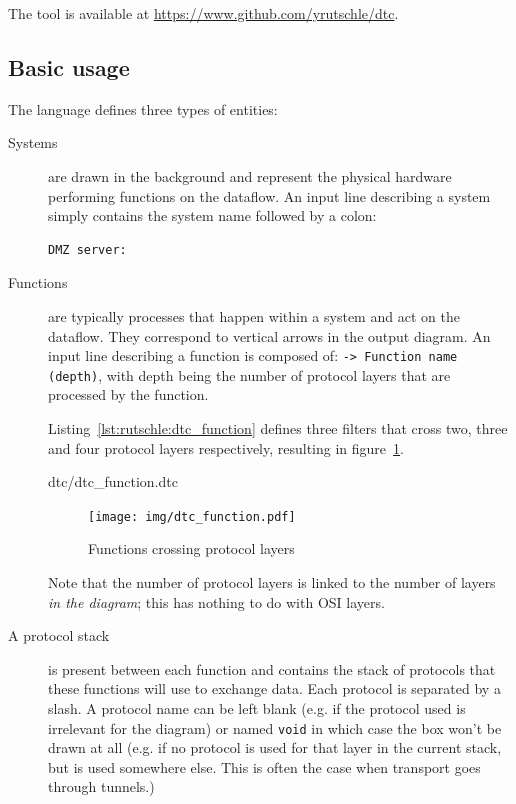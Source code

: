 \documentclass{article}
\begin{document}
The tool is available at \url{https://www.github.com/yrutschle/dtc}.

\subsection{Basic usage}


The language defines three types of entities:

\begin{description}
	\item[Systems] are drawn in the background and represent the
    physical hardware performing functions on the dataflow. An
    input line describing a system simply contains the system
    name followed by a colon:

    \begin{lstlisting}[language={},caption={System line},label={lst:rutschle:dtc_system}]
        DMZ server:
	\end{lstlisting}

\item[Functions] are typically processes that happen within a system and act on
	the dataflow. They correspond to vertical arrows in the output diagram.
	An input line describing a function is composed of:
	\verb+-> Function name (depth)+, with depth being
	the number of protocol layers that are
	processed by the function.


	Listing~\ref{lst:rutschle:dtc_function} defines three filters that cross two, three and four protocol layers respectively, resulting in figure~\ref{fig:rutschle:dtc_function}.

	
			 {dtc/dtc_function.dtc}
	\begin{figure}[ht]
		\centering
		\texttt{[image: img/dtc\_function.pdf]}
		\caption{Functions crossing protocol layers}
		\label{fig:rutschle:dtc_function}
	\end{figure}

    Note that the number of protocol layers is linked to the number of layers
    \emph{in the diagram}; this has nothing to do with OSI layers.

	\item[A protocol stack] is present between each function and contains
		the stack of protocols that these functions will use to
		exchange data. Each protocol is separated by a slash.  A
		protocol name can be left blank (e.g. if the protocol used is
		irrelevant for the diagram) or named \verb+void+ in which case the
		box won't be drawn at all (e.g. if no protocol is used for that
		layer in the current stack, but is used somewhere else. This is
		often the case when transport goes through tunnels.)


\end{description}
\end{document}
